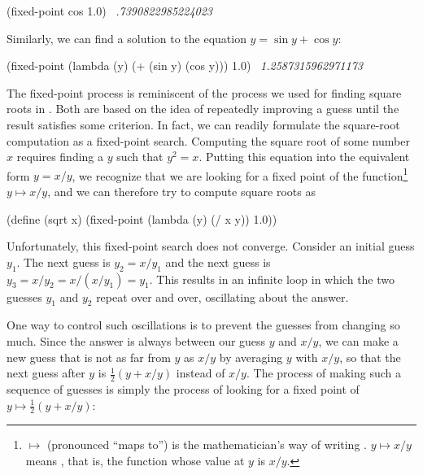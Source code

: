 \begin{codeBlock}
(fixed-point cos 1.0)
~\textit{.7390822985224023}~
\end{codeBlock}

\noindent
Similarly, we can find a solution to the equation
\( y = \sin y + \cos y \):

\begin{codeBlock}
(fixed-point (lambda (y) (+ (sin y) (cos y)))
             1.0)
~\textit{1.2587315962971173}~
\end{codeBlock}

\noindent
The fixed-point process is reminiscent of the process we used for finding
square roots in .  Both are based on the idea of repeatedly
improving a guess until the result satisfies some criterion.  In fact, we can
readily formulate the square-root computation as a fixed-point search.
Computing the square root of some number \( x \) requires finding a \( y \) such
that \( y^2 = x \).  Putting this equation into the equivalent form
\( y = x / y \), we recognize that we are looking for a fixed point of the
function\footnote{\( \mapsto \) (pronounced ``maps to'') is the mathematician's way of
writing .  \( y \mapsto x / y \) means ,
that is, the function whose value at \( y \) is \( x / y \).} \( y \mapsto x / y \),
and we can therefore try to compute square roots as

\begin{codeBlock}
(define (sqrt x)
  (fixed-point (lambda (y) (/ x y))
               1.0))
\end{codeBlock}

\noindent
Unfortunately, this fixed-point search does not converge.  Consider an initial
guess \( y_1 \).  The next guess is \( y_2 = x / y_1 \) and the next guess is
\( y_3 = x / y_2 = x / (x / y_1) = y_1 \).  This results in an
infinite loop in which the two guesses \( y_1 \) and \( y_2 \) repeat over and
over, oscillating about the answer.

One way to control such oscillations is to prevent the guesses from changing so
much.  Since the answer is always between our guess \( y \) and \( x / y \), we
can make a new guess that is not as far from \( y \) as \( x / y \) by averaging
\( y \) with \( x / y \), so that the next guess after \( y \) is
\( \frac{1}{2}(y + x / y) \)
instead of \( x / y \).  The process of making such a sequence of
guesses is simply the process of looking for a fixed point of
\( y \mapsto \frac{1}{2}(y + x / y) \):

